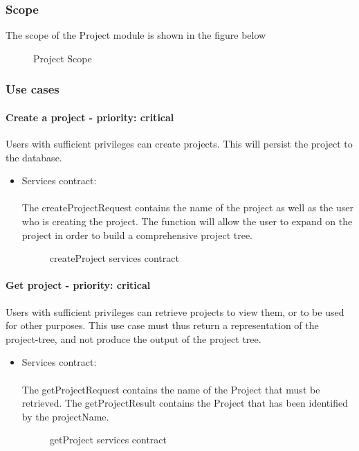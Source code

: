 \subsubsection{Scope}
The scope of the Project module is shown in the figure below
	\begin{figure}[H]
	    	\centering
	    	\caption{Project Scope}
	    	\label{fig:Project_Scope}
   	\end{figure}
\subsubsection{Use cases}

\paragraph{Create a project - priority: critical}
Users with sufficient privileges can create projects. This will persist the project to the database.

\begin{itemize}
	\item Services contract:\\ \\
	The createProjectRequest contains the name of the project as well as the user who is creating the project. The function will allow the user to expand on the project in order to build a comprehensive project tree.
	\begin{figure}[H]
    	\centering
    	\caption{createProject services contract}
    	\label{fig:createProject_services_contract}
   	\end{figure}
\end{itemize}

\paragraph{Get project - priority: critical}
Users with sufficient privileges can retrieve projects to view them, or to be used for other purposes. This use case must thus return a representation of the project-tree, and not produce the output of the project tree.

\begin{itemize}
	\item Services contract:\\ \\
	The getProjectRequest contains the name of the Project that must be retrieved. The getProjectResult contains the Project that has been identified by the projectName.
	\begin{figure}[H]
    	\centering
    	\caption{getProject services contract}
    	\label{fig:getProject_services_contract}
   	\end{figure}
\end{itemize}

